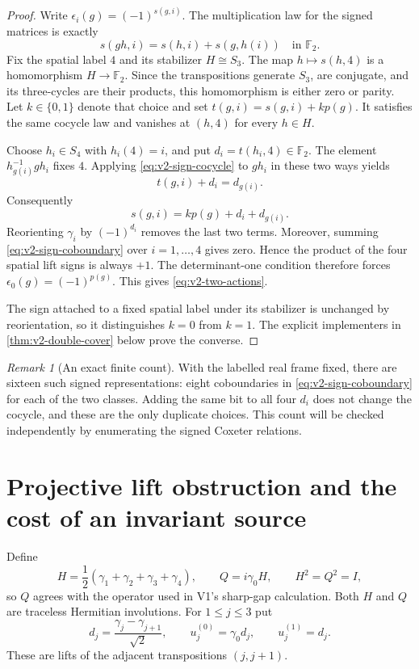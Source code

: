 \documentclass[11pt]{article}
\theoremstyle{definition}
\theoremstyle{remark}
\newtheorem{remark}[remark]{Remark}
\newcommand{\F}{\mathbb F}
\begin{document}
\begin{proof}
Write $\epsilon_i(g)=(-1)^{s(g,i)}$. The multiplication law for the signed
matrices is exactly
\begin{equation}
 s(gh,i)=s(h,i)+s(g,h(i))\quad\text{in }\F_2.
 \label{eq:v2-sign-cocycle}
\end{equation}
Fix the spatial label $4$ and its stabilizer $H\cong S_3$. The map
$h\mapsto s(h,4)$ is a homomorphism $H\to\F_2$. Since the transpositions
generate $S_3$, are conjugate, and its three-cycles are their products, this
homomorphism is either zero or parity. Let $k\in\{0,1\}$ denote that
choice and set $t(g,i)=s(g,i)+kp(g)$. It satisfies the same cocycle law
and vanishes at $(h,4)$ for every $h\in H$.

Choose $h_i\in S_4$ with $h_i(4)=i$, and put $d_i=t(h_i,4)\in\F_2$.
The element $h_{g(i)}^{-1}gh_i$ fixes $4$. Applying
\eqref{eq:v2-sign-cocycle} to $gh_i$ in these two ways yields
\[
 t(g,i)+d_i=d_{g(i)}.
\]
Consequently
\begin{equation}
 s(g,i)=kp(g)+d_i+d_{g(i)}.
 \label{eq:v2-sign-coboundary}
\end{equation}
Reorienting $\gamma_i$ by $(-1)^{d_i}$ removes the last two terms.
Moreover, summing \eqref{eq:v2-sign-coboundary} over $i=1,\ldots,4$
gives zero. Hence the product of the four spatial lift signs is always
$+1$. The determinant-one condition therefore forces
$\epsilon_0(g)=(-1)^{p(g)}$. This gives \eqref{eq:v2-two-actions}.

The sign attached to a fixed spatial label under its stabilizer is unchanged
by reorientation, so it distinguishes $k=0$ from $k=1$. The explicit
implementers in \cref{thm:v2-double-cover} below prove the converse.
\end{proof}

\begin{remark}[An exact finite count]
With the labelled real frame fixed, there are sixteen such signed
representations: eight coboundaries in \eqref{eq:v2-sign-coboundary} for
each of the two classes. Adding the same bit to all four $d_i$ does not
change the cocycle, and these are the only duplicate choices. This count
will be checked independently by enumerating the signed Coxeter relations.
\end{remark}

\section{Projective lift obstruction and the cost of an invariant source}
\label{sec:v2-lifts}
Define
\begin{equation}
 H=\frac12(\gamma_1+\gamma_2+\gamma_3+\gamma_4),\qquad
 Q=i\gamma_0H,\qquad H^2=Q^2=I,
 \label{eq:v2-HQ}
\end{equation}
so $Q$ agrees with the operator used in V1's sharp-gap calculation.
Both $H$ and $Q$ are traceless Hermitian involutions. For $1\le j\le3$ put
\begin{equation}
 d_j=\frac{\gamma_j-\gamma_{j+1}}{\sqrt2},\qquad
 u_j^{(0)}=\gamma_0d_j,\qquad u_j^{(1)}=d_j.
 \label{eq:v2-adjacent-lifts}
\end{equation}
These are lifts of the adjacent transpositions $(j,j+1)$.
\end{document}
